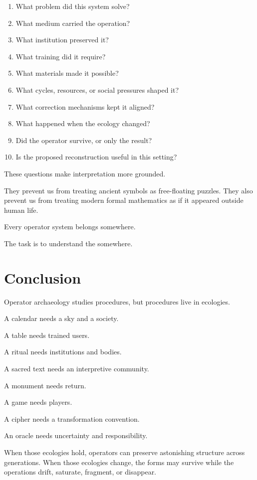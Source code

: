 \documentclass[11pt]{book}
\begin{document}
\begin{enumerate}[label=\arabic*.]
    \item What problem did this system solve?
    \item What medium carried the operation?
    \item What institution preserved it?
    \item What training did it require?
    \item What materials made it possible?
    \item What cycles, resources, or social pressures shaped it?
    \item What correction mechanisms kept it aligned?
    \item What happened when the ecology changed?
    \item Did the operator survive, or only the result?
    \item Is the proposed reconstruction useful in this setting?
\end{enumerate}

These questions make interpretation more grounded.

They prevent us from treating ancient symbols as free-floating puzzles. They also prevent us from treating modern formal mathematics as if it appeared outside human life.

Every operator system belongs somewhere.

The task is to understand the somewhere.

\section{Conclusion}

Operator archaeology studies procedures, but procedures live in ecologies.

A calendar needs a sky and a society.

A table needs trained users.

A ritual needs institutions and bodies.

A sacred text needs an interpretive community.

A monument needs return.

A game needs players.

A cipher needs a transformation convention.

An oracle needs uncertainty and responsibility.

When those ecologies hold, operators can preserve astonishing structure across generations. When those ecologies change, the forms may survive while the operations drift, saturate, fragment, or disappear.
\end{document}
